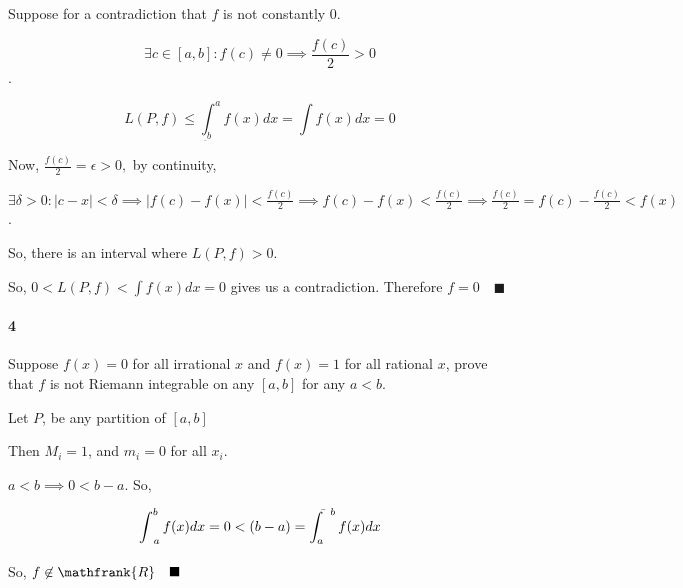 \documentclass{article}
\begin{document}

Suppose for a contradiction that $f$ is not constantly $0$.

$$\exists c \in [a,b]: f(c) \neq 0 \implies \frac{f(c)}{2}
> 0$$.

\[ L(P,f) \leq \int_{\underbar{} b}^af(x)dx = \int f(x) dx = 0\]

Now, $\frac{f(c)}{2} = \epsilon >0,$ by continuity,

$\exists \delta > 0: |c-x| < \delta \implies |f(c) - f(x)| <
\frac{f(c)}{2} \implies f(c) - f(x) < \frac{f(c)}{2} \implies
\frac{f(c)}{2} = f(c) - \frac{f(c)}{2} < f(x)$.

So, there is an interval where $L(P,f) > 0$.

So,  $0< L(P,f) < \int f(x) dx  = 0$ gives us a contradiction. Therefore $f = 0$$\quad \blacksquare$

\paragraph{4} Suppose $f(x) = 0$ for all irrational $x$ and $f(x) = 1$
for all rational $x$, prove that $f$ is not Riemann integrable on any
$[a,b]$ for any $a<b$.


Let $P$, be any partition of $[a,b]$

Then $M_i = 1$, and $m_i = 0$ for all $x_i$.

$a < b \implies 0 < b-a$. So,

\[\int_{\underbar{}\enskip a}^b f(x)dx =0<  (b-a) =
  \int_a^{\bar{}\enskip b} f(x) dx \]

So, $f \not\in \mathfrank{R} \quad \blacksquare$
\end{document}
